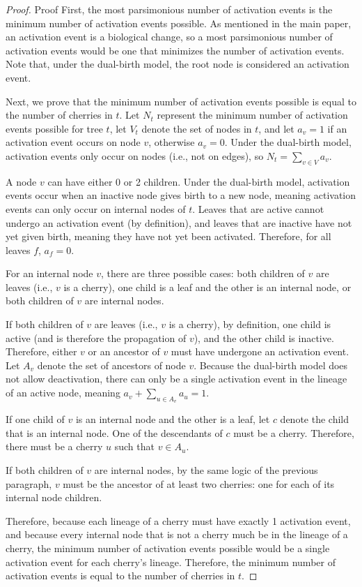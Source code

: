 \begin{proof}{Proof}
First, the most parsimonious number of activation events is the minimum number of activation events possible. As mentioned in the main paper, an activation event is a biological change, so a most parsimonious number of activation events would be one that minimizes the number of activation events. Note that, under the dual-birth model, the root node is considered an activation event.

Next, we prove that the minimum number of activation events possible is equal to the number of cherries in $t$. Let $N_t$ represent the minimum number of activation events possible for tree $t$, let $V_t$ denote the set of nodes in $t$, and let $a_v = 1$ if an activation event occurs on node $v$, otherwise $a_v = 0$. Under the dual-birth model, activation events only occur on nodes (i.e., not on edges), so $N_t = \sum_{v \in V}{a_v}$.

A node $v$ can have either 0 or 2 children. Under the dual-birth model, activation events occur when an inactive node gives birth to a new node, meaning activation events can only occur on internal nodes of $t$. Leaves that are active cannot undergo an activation event (by definition), and leaves that are inactive have not yet given birth, meaning they have not yet been activated. Therefore, for all leaves $f$, $a_f = 0$.

For an internal node $v$, there are three possible cases: both children of $v$ are leaves (i.e., $v$ is a cherry), one child is a leaf and the other is an internal node, or both children of $v$ are internal nodes.

If both children of $v$ are leaves (i.e., $v$ is a cherry), by definition, one child is active (and is therefore the propagation of $v$), and the other child is inactive. Therefore, either $v$ or an ancestor of $v$ must have undergone an activation event. Let $A_v$ denote the set of ancestors of node $v$. Because the dual-birth model does not allow deactivation, there can only be a single activation event in the lineage of an active node, meaning $a_v + \sum_{u \in A_v}{a_u} = 1$.

If one child of $v$ is an internal node and the other is a leaf, let $c$ denote the child that is an internal node. One of the descendants of $c$ must be a cherry. Therefore, there must be a cherry $u$ such that $v \in A_u$.

If both children of $v$ are internal nodes, by the same logic of the previous paragraph, $v$ must be the ancestor of at least two cherries: one for each of its internal node children.

Therefore, because each lineage of a cherry must have exactly 1 activation event, and because every internal node that is not a cherry much be in the lineage of a cherry, the minimum number of activation events possible would be a single activation event for each cherry's lineage. Therefore, the minimum number of activation events is equal to the number of cherries in $t$.
\end{proof}

